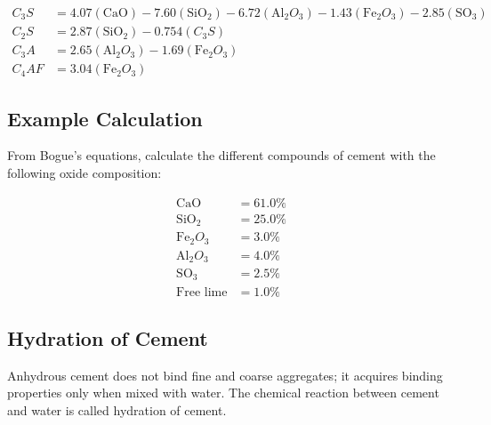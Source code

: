 \documentclass[a4paper,11pt]{book}
\begin{document}
\begin{align*}
C_3S &= 4.07(\text{CaO}) - 7.60(\text{SiO}_2) - 6.72(\text{Al}_2O_3) - 1.43(\text{Fe}_2O_3) - 2.85(\text{SO}_3) \\
C_2S &= 2.87(\text{SiO}_2) - 0.754(C_3S) \\
C_3A &= 2.65(\text{Al}_2O_3) - 1.69(\text{Fe}_2O_3) \\
C_4AF &= 3.04(\text{Fe}_2O_3)
\end{align*}

\subsection*{Example Calculation}
From Bogue's equations, calculate the different compounds of cement with the following oxide composition:

\begin{align*}
\text{CaO} &= 61.0\% \\
\text{SiO}_2 &= 25.0\% \\
\text{Fe}_2O_3 &= 3.0\% \\
\text{Al}_2O_3 &= 4.0\% \\
\text{SO}_3 &= 2.5\% \\
\text{Free lime} &= 1.0\%
\end{align*}

\subsection*{Hydration of Cement}
Anhydrous cement does not bind fine and coarse aggregates; it acquires binding properties only when mixed with water. The chemical reaction between cement and water is called hydration of cement.
\end{document}
